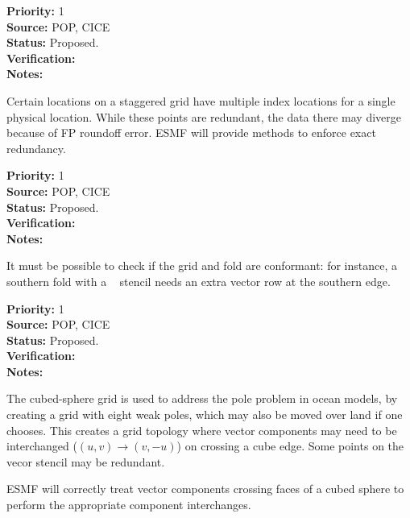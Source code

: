 
\begin{reqlist}
{\bf Priority:} 1 \\ 
{\bf Source:} POP, CICE \\
{\bf Status:} Proposed. \\
{\bf Verification:} \\
{\bf Notes:}
\end{reqlist}


Certain locations on a staggered grid have multiple index locations
for a single physical location. While these points are redundant, the
data there may diverge because of FP roundoff error. ESMF will provide
methods to enforce exact redundancy.

\begin{reqlist}
{\bf Priority:} 1 \\ 
{\bf Source:} POP, CICE \\
{\bf Status:} Proposed. \\
{\bf Verification:} \\
{\bf Notes:}
\end{reqlist}


It must be possible to check if the grid and fold are conformant:
for instance, a southern fold with a \bgrid~ stencil needs an extra
vector row at the southern edge.

\begin{reqlist}
{\bf Priority:} 1 \\ 
{\bf Source:} POP, CICE \\
{\bf Status:} Proposed. \\
{\bf Verification:} \\
{\bf Notes:}
\end{reqlist}


The cubed-sphere grid \cite{ref:rpm1996} is used to address the pole
problem in ocean models, by creating a grid with eight weak poles,
which may also be moved over land if one chooses. This creates a grid
topology where vector components may need to be interchanged
($(u,v)\longrightarrow(v,-u)$) on crossing a cube edge. Some points on
the vecor stencil may be redundant.


ESMF will correctly treat vector components crossing faces of a cubed
sphere to perform the appropriate component interchanges.

